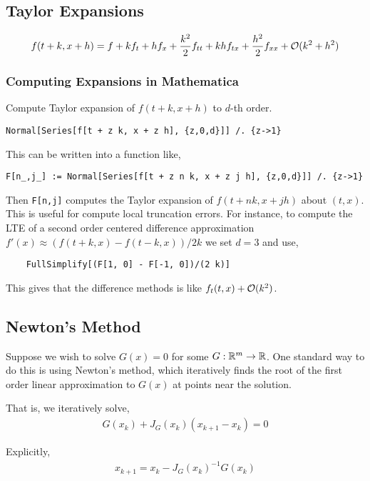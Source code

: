 \documentclass[12pt]{article}
\begin{document}
\subsection{Taylor Expansions}
\begin{align*}
    f(t+k,x+h) = f + kf_t + hf_x + \frac{k^2}{2}f_{tt} + kh f_{tx} + \frac{h^2}{2} f_{xx} + \mathcal{O}(k^2+h^2)
\end{align*}


\subsubsection{Computing Expansions in Mathematica}
Compute Taylor expansion of \( f(t+k,x+h) \) to \( d \)-th order.
\begin{lstlisting}
Normal[Series[f[t + z k, x + z h], {z,0,d}]] /. {z->1}
\end{lstlisting}

This can be written into a function like,
\begin{lstlisting}
F[n_,j_] := Normal[Series[f[t + z n k, x + z j h], {z,0,d}]] /. {z->1}
\end{lstlisting}

Then {\tt F[n,j]} computes the Taylor expansion of \( f(t+nk,x+jh) \) about \( (t,x) \). This is useful for compute local truncation errors. For instance, to compute the LTE of a second order centered difference approximation \( f'(x) \approx (f(t+k,x)-f(t-k,x))/2k \) we set \( d=3 \) and use,
\begin{lstlisting}
    FullSimplify[(F[1, 0] - F[-1, 0])/(2 k)]
\end{lstlisting}
This gives that the difference methods is like \( f_t(t,x) + \mathcal{O}(k^2) \).


\subsection{Newton's Method}
Suppose we wish to solve \( G(x) = 0 \) for some \( G:\mathbb{R}^m\to \mathbb{R} \). One standard way to do this is using Newton's method, which iteratively finds the root of the first order linear approximation to \( G(x) \) at points near the solution.

That is, we iteratively solve,
\begin{align*}
    G(x_k) + J_G(x_k) (x_{k+1}-x_k) = 0
\end{align*}

Explicitly,
\begin{align*}
    x_{k+1} = x_k - J_G(x_k)^{-1} G(x_k)
\end{align*}
\end{document}
